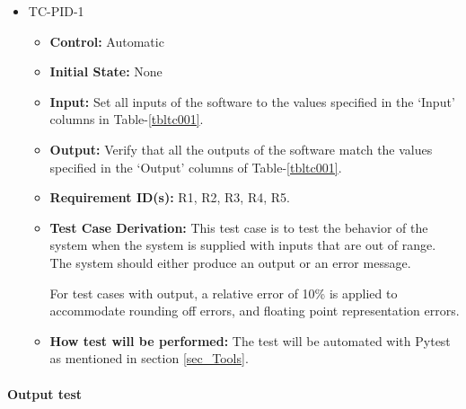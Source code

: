 \documentclass[12pt, titlepage]{article}
\begin{document}
\begin{itemize}
\item{TC-PID-1\\}
\begin{itemize}

\item{\textbf{Control:}} Automatic
					
\item{\textbf{Initial State:}} None
					
\item{\textbf{Input:}} Set all inputs of the software to the values specified in the 
`Input' columns in Table-\ref{tbltc001}.
					
\item{\textbf{Output:}}  Verify that all the outputs of the software match the 
values specified in the `Output' columns of Table-\ref{tbltc001}.


\item{\textbf{Requirement ID(s):}}  R1, R2, R3, R4, R5.

\item{\textbf{Test Case Derivation:}}  This test case is to test the behavior of the system 
when the system is supplied with inputs that are out of range. The system should either
produce an output or an error message. 

For test cases with output, a relative error of 10\% is applied to accommodate rounding off errors,
and floating point representation errors.

					
\item{\textbf{How test will be performed:}}  The test will be automated with Pytest as mentioned in 
section \ref{sec_Tools}. 
					
\end{itemize}
\end{itemize}

\paragraph{Output test}
\end{document}
